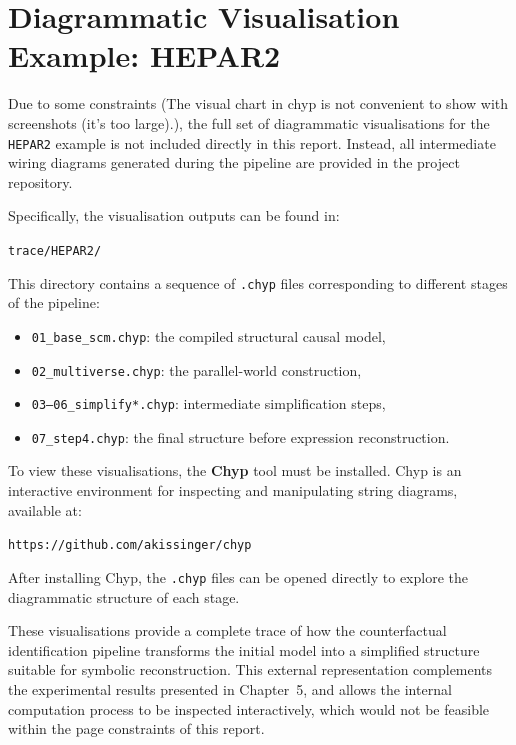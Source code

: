 \documentclass[a4paper]{report}
\begin{document}
\chapter{Diagrammatic Visualisation Example: HEPAR2}
\label{app:hepar2_vis}

Due to some constraints (The visual chart in chyp is not convenient to show with screenshots (it's too large).), the full set of diagrammatic visualisations for the \texttt{HEPAR2} example is not included directly in this report. 
Instead, all intermediate wiring diagrams generated during the pipeline are provided in the project repository.

Specifically, the visualisation outputs can be found in:

\begin{center}
\texttt{trace/HEPAR2/}
\end{center}

This directory contains a sequence of \texttt{.chyp} files corresponding to different stages of the pipeline:

\begin{itemize}
    \item \texttt{01\_base\_scm.chyp}: the compiled structural causal model,
    \item \texttt{02\_multiverse.chyp}: the parallel-world construction,
    \item \texttt{03--06\_simplify*.chyp}: intermediate simplification steps,
    \item \texttt{07\_step4.chyp}: the final structure before expression reconstruction.
\end{itemize}

To view these visualisations, the \textbf{Chyp} tool must be installed. 
Chyp is an interactive environment for inspecting and manipulating string diagrams, available at:

\begin{center}
\texttt{https://github.com/akissinger/chyp}
\end{center}

After installing Chyp, the \texttt{.chyp} files can be opened directly to explore the diagrammatic structure of each stage.

These visualisations provide a complete trace of how the counterfactual identification pipeline transforms the initial model into a simplified structure suitable for symbolic reconstruction. 
This external representation complements the experimental results presented in Chapter~5, and allows the internal computation process to be inspected interactively, which would not be feasible within the page constraints of this report.
\end{document}
